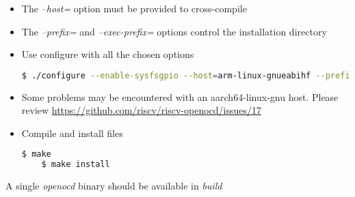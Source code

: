 \documentclass{article}
\begin{document}
\begin{itemize}
    \item The \textit{--host=} option must be provided to cross-compile
    
    \item The \textit{--prefix=} and \textit{--exec-prefix=} options control the installation directory
    
    \item Use configure with all the chosen options
    
    \begin{lstlisting}[language=bash]
    $ ./configure --enable-sysfsgpio --host=arm-linux-gnueabihf --prefix=<build dir> --exec-prefix=<build dir>
    \end{lstlisting}
    
    \item Some problems may be encountered with an aarch64-linux-gnu host. Please review \url{https://github.com/riscv/riscv-openocd/issues/17}
    
    \item Compile and install files
    
    \begin{lstlisting}[language=bash]
    $ make
    $ make install
    \end{lstlisting}
    
    \end{itemize}
    
    A single \textit{openocd} binary should be available in \textit{build}
    
\end{document}
